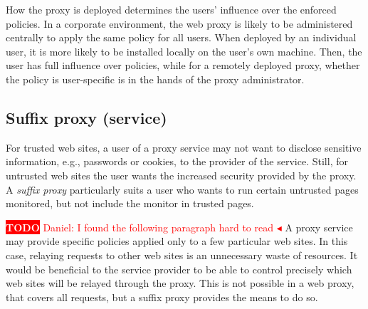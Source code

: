 \documentclass{llncs}
\newcommand{\todo}[1]{\colorbox{red}{\textcolor{white}{\sffamily\bfseries\scriptsize TODO}} \textcolor{red}{#1} \textcolor{red}{$\blacktriangleleft$}}
\begin{document}
How the proxy is 
deployed determines the users' influence over 
the enforced policies.
In a corporate environment, the web proxy is likely to be 
administered centrally to apply the same policy for all users. When deployed by 
an individual user, it is more likely to be installed locally on the user's own machine.
Then, the user has full influence over 
policies, while for a remotely deployed proxy,
whether the policy is user-specific is 
in the hands of the proxy administrator. 






\subsection{Suffix proxy (service)}
\label{sec:arch-suffix}


For trusted web sites, a user of a proxy service may not want to disclose
sensitive information, e.g., passwords or cookies, to the provider of the service.
Still, for untrusted web sites the user wants the increased security provided 
by the proxy.
A \emph{suffix proxy} particularly suits a user who wants to run certain untrusted 
pages monitored, but not include the monitor in trusted pages.

\todo{Daniel: I found the following paragraph hard to read}
A proxy service may provide specific policies applied only to a few 
particular web sites. In this case, relaying requests to other web sites is an 
unnecessary waste of resources. It would be beneficial to the service provider to be
able to control precisely which web sites will be relayed through the proxy. 
This is not possible in a web proxy, that covers all requests, but a suffix proxy 
provides the means to do so.
\end{document}
